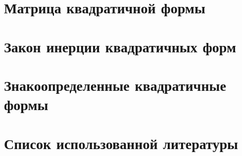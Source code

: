 \documentclass[a4paper,14pt]{report}
\begin{document}
\section{Матрица квадратичной формы}



\section{Закон инерции квадратичных форм}

\section{Знакоопределенные квадратичные формы}

\section{Список использованной литературы}
\end{document}
